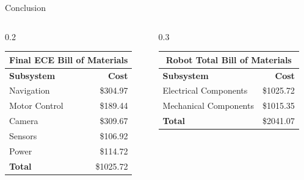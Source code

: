 \documentclass[final]{beamer}
\newlength{\colwidth}
\begin{document}
\begin{frame}[t]
\begin{columns}[t]
\begin{column}{\colwidth}
\begin{block}{Conclusion}
\begin{columns}[t]
    
    \begin{column}{0.2\colwidth}
      \begin{table}[ht]
        \begin{center}
          \label{tab:FinalECEBillofMaterials}
          \begin{tabular}{l|r} %
            \toprule
            \multicolumn{2}{c}{\textbf{Final ECE Bill of Materials}} \\
            \midrule
            \cellcolor{white}\textbf{Subsystem} & \cellcolor{white}\textbf{Cost} \\
            \midrule
            Navigation & \$304.97 \\
            Motor Control & \$189.44 \\
            Camera & \$309.67 \\
            Sensors & \$106.92 \\
            Power & \$114.72 \\
            \cellcolor{white}\textbf{Total} & \cellcolor{white}\$1025.72 \\
            \bottomrule
          \end{tabular}
        \end{center}
      \end{table}    
    \end{column}


    \begin{column}{0.3\colwidth}
      \begin{table}[ht]
        \begin{center}
          \label{tab:RobotTotalBillofMaterials}
          \begin{tabular}{l|r} %
            \toprule
            \multicolumn{2}{c}{\textbf{Robot Total Bill of Materials}} \\
            \midrule
            \cellcolor{white}\textbf{Subsystem} & \cellcolor{white}\textbf{Cost} \\
            \midrule
            Electrical Components & \$1025.72 \\
            Mechanical Components & \$1015.35 \\
            \cellcolor{white}\textbf{Total} & \cellcolor{white}\$2041.07 \\
            \bottomrule
          \end{tabular}
        \end{center}
      \end{table}    
    \end{column}



\end{columns}
\end{block}
\end{column}
\end{columns}
\end{frame}
\end{document}

